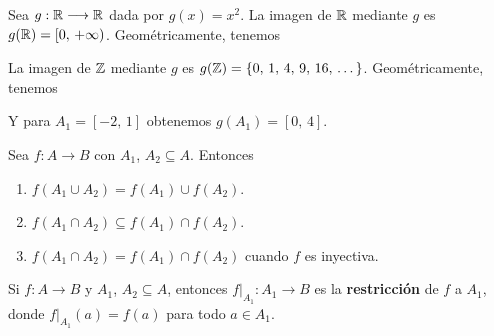 \begin{myexample}
    Sea $g: \RR \longrightarrow \RR$ dada por $g(x) = x^2$. La imagen de $\RR$ mediante $g$ es $g(\RR) = [0, \, + \infty)$. Geométricamente, tenemos
    \begin{center}
    \end{center}
    La imagen de $\ZZ$ mediante $g$ es $g(\ZZ) = \{0, \, 1, \, 4, \, 9, \, 16, \, \dots \}$. Geométricamente, tenemos
    \begin{center}
    \end{center}
    Y para $A_1 = [-2, \, 1]$ obtenemos $g(A_1)= [0, \, 4]$.
\end{myexample}

\begin{theorem}{}{}
    Sea $f: A \longrightarrow B$ con $A_1$, $A_2 \subseteq A$. Entonces
    \begin{enumerate}[label=\alph*)]
        \item $f(A_1 \cup A_2) = f(A_1) \cup f(A_2)$.
        \item $f(A_1 \cap A_2) \subseteq f(A_1) \cap f(A_2)$.
        \item $f(A_1 \cap A_2) = f(A_1) \cap f(A_2)$ cuando $f$ es inyectiva.
    \end{enumerate}
\end{theorem}

\begin{definicion}{}{}
    Si $f: A \longrightarrow B$ y $A_1$, $A_2 \subseteq A$, entonces $\left. f \right|_{A_1}: A_1 \longrightarrow B$ es la \textbf{restricción} de $f$ a $A_1$, donde $\left. f \right|_{A_1}(a) = f(a)$ para todo $a \in A_1$.
\end{definicion}

